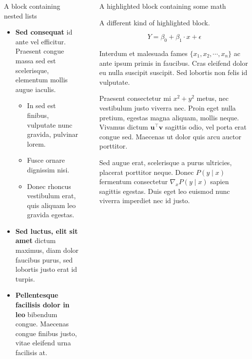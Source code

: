 \documentclass[final]{beamer}
\newlength{\sepwidth}
\newlength{\colwidth}
\newcommand{\separatorcolumn}{\begin{column}{\sepwidth}\end{column}}
\begin{document}
\begin{frame}[t]
\begin{columns}[t]
\begin{column}{\colwidth}
\begin{block}{A block containing nested lists}
    \begin{itemize}
      \item \textbf{Sed consequat} id ante vel efficitur. Praesent congue massa
        sed est scelerisque, elementum mollis augue iaculis.
        \begin{itemize}
          \item In sed est finibus, vulputate nunc gravida, pulvinar lorem.
          \item Fusce ornare dignissim nisi. 
          \item Donec rhoncus vestibulum erat, quis aliquam leo
            gravida egestas.
        \end{itemize}
      \item \textbf{Sed luctus, elit sit amet} dictum maximus, diam dolor
        faucibus purus, sed lobortis justo erat id turpis.
      \item \textbf{Pellentesque facilisis dolor in leo} bibendum congue.
        Maecenas congue finibus justo, vitae eleifend urna facilisis at.
    \end{itemize}

  \end{block}

\end{column}

\separatorcolumn

\begin{column}{\colwidth}

  \begin{exampleblock}{A highlighted block containing some math}

    A different kind of highlighted block.

    $$
    Y = \beta_0 + \beta_1 \cdot x + \epsilon
    $$

    Interdum et malesuada fames $\{x_1, x_2, \cdots, x_n \}$ ac ante ipsum primis in
    faucibus. Cras eleifend dolor eu nulla suscipit suscipit. Sed lobortis non
    felis id vulputate.


    Praesent consectetur mi $x^2 + y^2$ metus, nec vestibulum justo viverra
    nec. Proin eget nulla pretium, egestas magna aliquam, mollis neque. Vivamus
    dictum $\mathbf{u}^\intercal\mathbf{v}$ sagittis odio, vel porta erat
    congue sed. Maecenas ut dolor quis arcu auctor porttitor.


    Sed augue erat, scelerisque a purus ultricies, placerat porttitor neque.
    Donec $P(y \mid x)$ fermentum consectetur $\nabla_x P(y \mid x)$ sapien
    sagittis egestas. Duis eget leo euismod nunc viverra imperdiet nec id
    justo.


\end{exampleblock}
\end{column}
\end{columns}
\end{frame}
\end{document}
